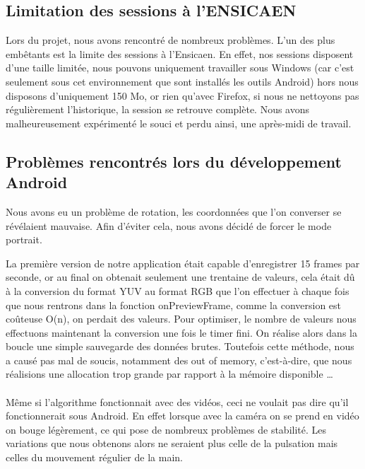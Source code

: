 \subsection{Limitation des sessions à l'ENSICAEN}

Lors du projet, nous avons rencontré de nombreux problèmes. L'un des plus embêtants est la limite des sessions à l'Ensicaen. En effet, nos sessions disposent d'une taille limitée, nous pouvons uniquement travailler sous Windows (car
c'est seulement sous cet environnement que sont installés les outils Android) hors nous disposons d'uniquement 150 Mo, or rien qu'avec Firefox, si nous ne nettoyons pas régulièrement l'historique, la session se retrouve
complète. Nous avons malheureusement expérimenté le souci et perdu ainsi, une après-midi de travail.

\subsection{Problèmes rencontrés lors du développement Android}

Nous avons eu un problème de rotation, les coordonnées que l'on converser se révélaient mauvaise. Afin d'éviter cela, nous avons décidé de forcer le mode portrait.

La première version de notre application était capable d'enregistrer 15 frames par seconde, or au final on obtenait seulement une trentaine de valeurs, cela était dû à la conversion du format YUV au format RGB que l'on
effectuer à chaque fois que nous rentrons dans la fonction onPreviewFrame, comme la conversion est coûteuse O(n), on perdait des valeurs. Pour optimiser, le nombre de valeurs nous effectuons maintenant la conversion
une fois le timer fini. On réalise alors dans la boucle une simple sauvegarde des données brutes.
Toutefois cette méthode, nous a causé pas mal de soucis, notamment des out of memory, c'est-à-dire, que nous réalisions une allocation trop grande par rapport à la mémoire disponible \ldots{}\\
\\
Même si l'algorithme fonctionnait avec des vidéos, ceci ne voulait pas dire qu'il fonctionnerait sous Android. En effet lorsque avec la caméra on se prend en vidéo on bouge légèrement, ce qui pose de nombreux
 problèmes de stabilité. Les variations que nous obtenons alors ne seraient plus celle de la pulsation mais celles du mouvement régulier de la main.


